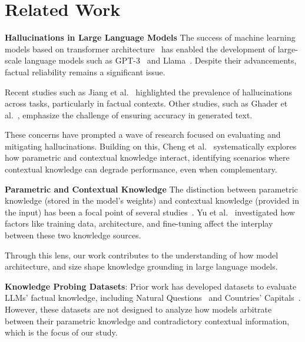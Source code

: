 \section{Related Work}
\label{related_work}



\textbf{Hallucinations in Large Language Models}
The success of machine learning models based on transformer architecture~\cite{attention_is_all_you_need} has enabled the development of large-scale language models such as GPT-3~\cite{gpt3} and Llama~\cite{llama}.
Despite their advancements, factual reliability remains a significant issue.

Recent studies such as Jiang et al.~\cite{how_can_we_know} highlighted the prevalence of hallucinations across tasks, particularly in factual contexts.
Other studies, such as Ghader et al.~\cite{can_rag_models_reason}, emphasize the challenge of ensuring accuracy in generated text.

These concerns have prompted a wave of research focused on evaluating and mitigating hallucinations.
Building on this, Cheng et al.~\cite{understanding_the_interplay} systematically explores how parametric and contextual knowledge interact, identifying scenarios where contextual knowledge can degrade performance, even when complementary.


\textbf{Parametric and Contextual Knowledge} 
The distinction between parametric knowledge (stored in the model's weights) and contextual knowledge (provided in the input) has been a focal point of several studies~\cite{knowledge}.
Yu et al.~\cite{factual_recall} investigated how factors like training data, architecture, and fine-tuning affect the interplay between these two knowledge sources.

Through this lens, our work contributes to the understanding of how model architecture, and size shape knowledge grounding in large language models.

\textbf{Knowledge Probing Datasets}: Prior work has developed datasets to evaluate LLMs' factual knowledge, including Natural Questions~\cite{natural_questions} and Countries' Capitals~\cite{factual_recall}. However, these datasets are not designed to analyze how models arbitrate between their parametric knowledge and contradictory contextual information, which is the focus of our study.

